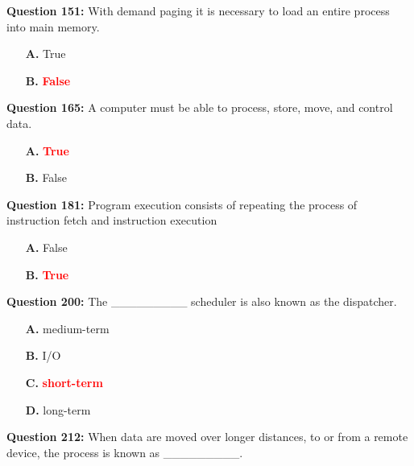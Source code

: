 \documentclass[12pt,a4paper]{article}
\begin{document}
\vspace{0.5cm}

\textbf{Question 151:} With demand paging it is necessary to load an entire process into main memory.

\begin{itemize}
    \item[\textbf{A.}] True
    \item[\textbf{B.}] \textcolor{red}{\textbf{False}}
\end{itemize}

\vspace{0.5cm}

\textbf{Question 165:} A computer must be able to process, store, move, and control data.

\begin{itemize}
    \item[\textbf{A.}] \textcolor{red}{\textbf{True}}
    \item[\textbf{B.}] False
\end{itemize}

\vspace{0.5cm}

\textbf{Question 181:} Program execution consists of repeating the process of instruction fetch and instruction execution

\begin{itemize}
    \item[\textbf{A.}] False
    \item[\textbf{B.}] \textcolor{red}{\textbf{True}}
\end{itemize}

\vspace{0.5cm}

\textbf{Question 200:} The _________ scheduler is also known as the dispatcher.

\begin{itemize}
    \item[\textbf{A.}] medium-term
    \item[\textbf{B.}] I/O
    \item[\textbf{C.}] \textcolor{red}{\textbf{short-term}}
    \item[\textbf{D.}] long-term
\end{itemize}

\vspace{0.5cm}

\textbf{Question 212:} When data are moved over longer distances, to or from a remote device, the process is known as _________.
\end{document}
